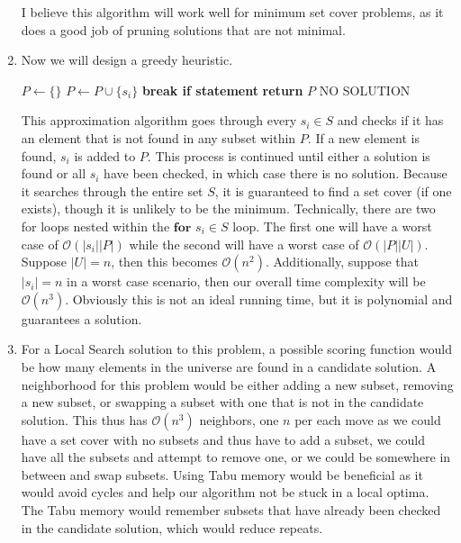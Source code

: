 \documentclass{article}
\begin{document}
\begin{enumerate}
I believe this algorithm will work well for minimum set cover problems, as it does a good job of pruning solutions that are not minimal. 

\item Now we will design a greedy heuristic. 
\begin{algorithm}[H]
\begin{algorithmic}[1]
	\State $P \gets \{ \}$
	\State $P \gets P \cup \{s_i\}$
	\State \textbf{break if statement}
	\EndIf
	\State \textbf{return} $P$
	\EndIf
	\EndFor
	\State \Return NO SOLUTION
	\EndProcedure
\end{algorithmic}	
\end{algorithm}

This approximation algorithm goes through every $s_i \in S$ and checks if it has an element that is not found in any subset within $P$. 
If a new element is found, $s_i$ is added to $P$. 
This process is continued until either a solution is found or all $s_i$ have been checked, in which case there is no solution. 
Because it searches through the entire set $S$, it is guaranteed to find a set cover (if one exists), though it is unlikely to be the minimum. 
Technically, there are two for loops nested within the $\textbf{for } s_i \in S$ loop. 
The first one will have a worst case of $\mathcal{O}(|s_i||P|)$ while the second will have a worst case of $\mathcal{O}(|P||U|)$. 
Suppose $|U| = n$, then this becomes $\mathcal{O}(n^2)$.
Additionally, suppose that $|s_i| = n$ in a worst case scenario, then our overall time complexity will be $\mathcal{O}(n^3)$. 
Obviously this is not an ideal running time, but it is polynomial and guarantees a solution. 

\item For a Local Search solution to this problem, a possible scoring function would be how many elements in the universe are found in a candidate solution. 
A neighborhood for this problem would be either adding a new subset, removing a new subset, or swapping a subset with one that is not in the candidate solution. 
This thus has $\mathcal{O}(n^3)$ neighbors, one $n$ per each move as we could have a set cover with no subsets and thus have to add a subset, we could have all the subsets and attempt to remove one, or we could be somewhere in between and swap subsets.
Using Tabu memory would be beneficial as it would avoid cycles and help our algorithm not be stuck in a local optima. 
The Tabu memory would remember subsets that have already been checked in the candidate solution, which would reduce repeats. 
\end{enumerate}
\end{document}
